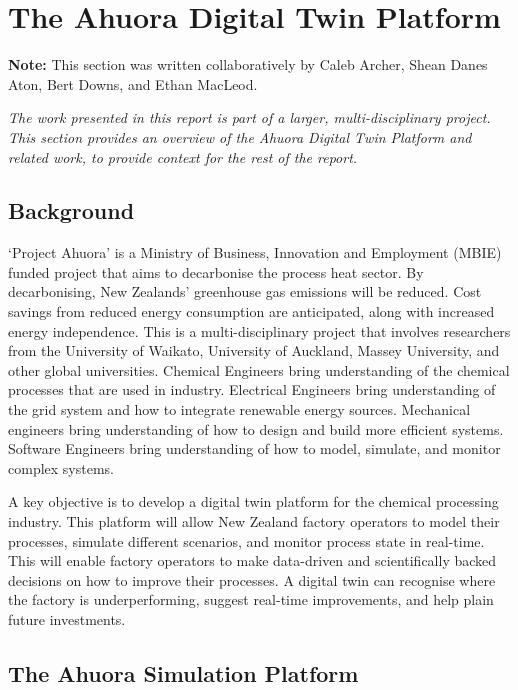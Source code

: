 \section{The Ahuora Digital Twin Platform}

\textbf{Note:} This section was written collaboratively by Caleb Archer, Shean Danes Aton, Bert Downs, and Ethan MacLeod.
\vspace{0.2cm}

\noindent\textit{The work presented in this report is part of a larger, multi-disciplinary project. This section provides an overview of the Ahuora Digital Twin Platform and related work, to provide context for the rest of the report.}

\subsection{Background}

`Project Ahuora' is a Ministry of Business, Innovation and Employment (MBIE) funded project that aims to decarbonise the process heat sector.
By decarbonising, New Zealands' greenhouse gas emissions will be reduced. Cost savings from reduced energy consumption are anticipated, along with increased energy independence.
This is a multi-disciplinary project that involves researchers from the University of Waikato, University of Auckland, Massey University,
and other global universities. Chemical Engineers bring understanding of the chemical processes that are used in industry. Electrical Engineers bring understanding of the grid system
and how to integrate renewable energy sources. Mechanical engineers bring understanding of how to design and build more efficient systems. Software Engineers bring understanding of how to
model, simulate, and monitor complex systems.

A key objective is to develop a digital twin platform for the chemical processing industry. This platform will allow New Zealand factory operators to model their processes, simulate different scenarios, and monitor process state in real-time.
This will enable factory operators to make data-driven and scientifically backed decisions on how to improve their processes. A digital twin can recognise where the factory is underperforming, suggest real-time improvements, and help plain future investments.

\subsection{The Ahuora Simulation Platform}

